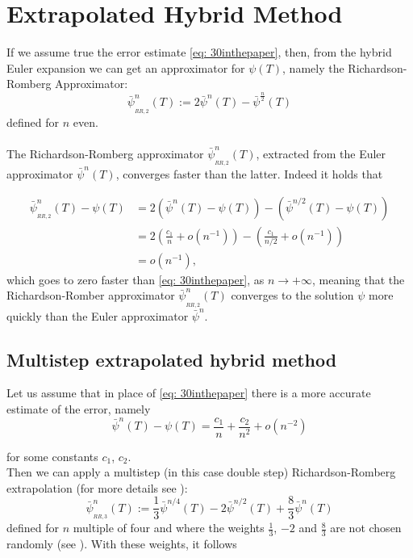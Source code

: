 \documentclass[a4paper,italian,11pt]{book}
\theoremstyle{plain}
\theoremstyle{remark}
\theoremstyle{plain}
\begin{document}
\section{Extrapolated Hybrid Method}
\label{section: extrapolatedhyb}
If we assume true the error estimate \eqref{eq: 30inthepaper}, then, from the hybrid Euler expansion we can get an approximator for $\psi(T)$, namely the 
Richardson-Romberg Approximator:
\begin{equation}
    \label{eq: RR.1}
    \bar{\psi}^n_{_{RR,2}}(T) := 2 \bar{\psi}^n(T) - \bar{\psi}^{\frac{n}{2}}(T)
\end{equation}
defined for $n$ even.
\\\
\\
The Richardson-Romberg approximator $\bar{\psi}^n_{_{RR,2}}(T)$, extracted from the Euler approximator $\bar{\psi}^n(T)$, converges faster than the latter. Indeed it holds that

\begin{equation*}
    \begin{aligned}
    \bar{\psi}^n_{_{RR,2}}(T) - \psi(T) &= 2\left( \bar{\psi}^n(T) - \psi(T) \right) - \left( \bar{\psi}^{n/2}(T) - \psi(T) \right) \\
    &= 2\left( \frac{c_1}{n} + o(n^{-1}) \right) - \left( \frac{c_1}{n/2} +o(n^{-1}) \right) 
    \\
    &= o(n^{-1}),
    \end{aligned}
\end{equation*}
which goes to zero faster than \eqref{eq: 30inthepaper}, as $n\to +\infty$, meaning that the Richardson-Romber approximator $\bar{\psi}^n_{_{RR,2}}(T)$ converges to the solution $\psi$ more quickly than the Euler approximator $\bar{\psi}^n$.

\subsection{Multistep extrapolated hybrid method}
\label{subsection: multiStepRR}

Let us assume that in place of \eqref{eq: 30inthepaper} there is a more accurate estimate of the error, namely
\begin{equation}
    \label{eq: moreAccurateEstimate}
    \bar{\psi}^n(T)-\psi(T) = \frac{c_1}{n} + \frac{c_2}{n^2} + o(n^{-2})
\end{equation}

for some constants $c_1$, $c_2$. \\
Then we can apply a multistep (in this case double step) Richardson-Romberg extrapolation (for more details see \cite{RR3extr}):
\begin{equation}
    \label{eq: multiStepRR}
    \bar{\psi}^n_{_{RR,3}}(T) := \frac{1}{3} \bar{\psi}^{n/4}(T) - 2 \bar{\psi}^{n/2}(T) + \frac{8}{3}\bar{\psi}^n(T)
\end{equation}
defined for $n$ multiple of four and 
where the weights $\frac{1}{3}$, $-2$ and $\frac{8}{3}$ are not chosen randomly (see \cite{RR3extr}). With these weights, it follows
\end{document}
